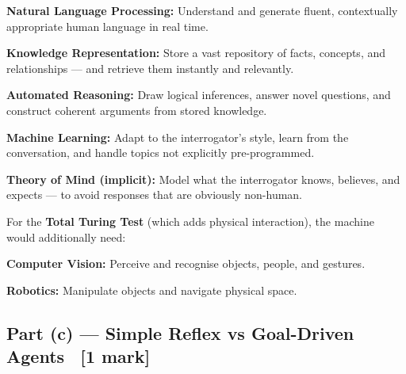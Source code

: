 \documentclass[12pt, a4paper]{article}
\begin{document}
\begin{keypoints}
  \item \textbf{Natural Language Processing:} Understand and generate fluent, contextually appropriate human language in real time.
  \item \textbf{Knowledge Representation:} Store a vast repository of facts, concepts, and relationships — and retrieve them instantly and relevantly.
  \item \textbf{Automated Reasoning:} Draw logical inferences, answer novel questions, and construct coherent arguments from stored knowledge.
  \item \textbf{Machine Learning:} Adapt to the interrogator's style, learn from the conversation, and handle topics not explicitly pre-programmed.
  \item \textbf{Theory of Mind (implicit):} Model what the interrogator knows, believes, and expects — to avoid responses that are obviously non-human.
\end{keypoints}

\noindent For the \textbf{Total Turing Test} (which adds physical interaction), the machine would additionally need:
\begin{keypoints}
  \item \textbf{Computer Vision:} Perceive and recognise objects, people, and gestures.
  \item \textbf{Robotics:} Manipulate objects and navigate physical space.
\end{keypoints}

\subsection{Part (c) — Simple Reflex vs Goal-Driven Agents \ [1 mark]}
\end{document}
